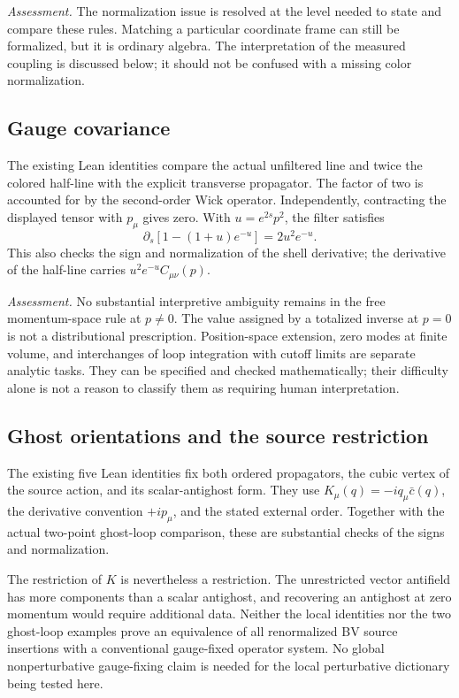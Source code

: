 \documentclass[11pt]{article}
\begin{document}
\emph{Assessment.} The normalization issue is resolved at the level needed
to state and compare these rules. Matching a particular coordinate frame
can still be formalized, but it is ordinary algebra. The interpretation of
the measured coupling is discussed below; it should not be confused with a
missing color normalization.

\subsection{Gauge covariance}

The existing Lean identities compare the actual unfiltered line and twice
the colored half-line with the explicit transverse propagator. The factor
of two is accounted for by the second-order Wick operator. Independently,
contracting the displayed tensor with $p_\mu$ gives zero. With
$u=e^{2s}p^2$, the filter satisfies
\[
 \partial_s[1-(1+u)e^{-u}]=2u^2e^{-u}.
\]
This also checks the sign and normalization of the shell derivative; the
derivative of the half-line carries $u^2e^{-u}C_{\mu\nu}(p)$.

\emph{Assessment.} No substantial interpretive ambiguity remains in the
free momentum-space rule at $p\ne0$. The value assigned by a totalized
inverse at $p=0$ is not a distributional prescription. Position-space
extension, zero modes at finite volume, and interchanges of loop integration
with cutoff limits are separate analytic tasks. They can be specified and
checked mathematically; their difficulty alone is not a reason to classify
them as requiring human interpretation.

\subsection{Ghost orientations and the source restriction}

The existing five Lean identities fix both ordered propagators, the cubic
vertex of the source action, and its scalar-antighost form. They use
$K_\mu(q)=-iq_\mu\bar c(q)$, the derivative convention $+ip_\mu$, and
the stated external order. Together with the actual two-point ghost-loop
comparison, these are substantial checks of the signs and normalization.

The restriction of $K$ is nevertheless a restriction. The unrestricted
vector antifield has more components than a scalar antighost, and
recovering an antighost at zero momentum would require additional data.
Neither the local identities nor the two ghost-loop examples prove an
equivalence of all renormalized BV source insertions with a conventional
gauge-fixed operator system. No global nonperturbative gauge-fixing claim
is needed for the local perturbative dictionary being tested here.
\end{document}
